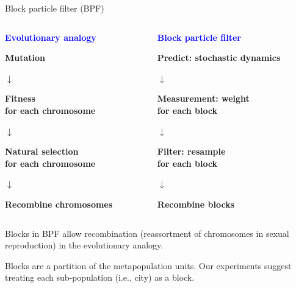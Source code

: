 \documentclass{beamer}
\begin{document}
\begin{frame}{Block particle filter (BPF)}

  \begin{columns}
    \begin{column}{0.48\linewidth}
      \begin{center}
      {\bf \textcolor{blue}{Evolutionary analogy}}

      \vspace{5mm}
      
      {\bf Mutation}

      $\downarrow$

      {\bf Fitness\\
      for each chromosome}

      $\downarrow$

      {\bf Natural selection\\
      for each chromosome}

      $\downarrow$

      {\bf Recombine chromosomes}
      
      \end{center}
    \end{column}
     \begin{column}{0.48\linewidth}
      \begin{center}
      {\bf \textcolor{blue}{Block particle filter}}

      \vspace{5mm}
      
      {\bf Predict: stochastic dynamics}

      $\downarrow$

      {\bf Measurement: weight\\
      for each block}

      $\downarrow$

      {\bf Filter: resample\\
      for each block}

      $\downarrow$

      {\bf Recombine blocks}
      \end{center}
    \end{column}
  \end{columns}

  \vspace{5mm}
  
    \begin{myitemize}
    \item Blocks in BPF allow recombination (reassortment of chromosomes in sexual reproduction) in the evolutionary analogy.
    \item Blocks are a partition of the metapopulation units. Our experiments suggest treating each sub-population (i.e., city) as a block.

  \end{myitemize}

\end{frame}
\end{document}
